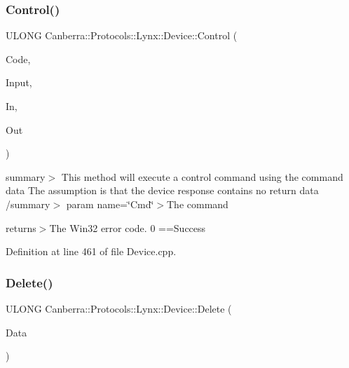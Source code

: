 \subsubsection{\texorpdfstring{Control()}{Control()}\hspace{0.1cm}{\footnotesize\ttfamily [4/4]}}
{\footnotesize\ttfamily U\+L\+O\+NG Canberra\+::\+Protocols\+::\+Lynx\+::\+Device\+::\+Control (\begin{DoxyParamCaption}\item[{L\+O\+NG}]{Code,  }\item[{U\+S\+H\+O\+RT}]{Input,  }\item[{\hyperlink{class_canberra_1_1_utility_1_1_core_1_1_byte_stream}{Canberra\+::\+Utility\+::\+Core\+::\+Byte\+Stream} \&}]{In,  }\item[{\hyperlink{class_canberra_1_1_utility_1_1_core_1_1_byte_stream}{Canberra\+::\+Utility\+::\+Core\+::\+Byte\+Stream} \&}]{Out }\end{DoxyParamCaption})}

summary$>$ This method will execute a control command using the command data The assumption is that the device response contains no return data /summary$>$ param name=\char`\"{}\+Cmd\char`\"{}$>$The command

returns$>$The Win32 error code. 0 ==Success

Definition at line 461 of file Device.\+cpp.

\mbox{\label{class_canberra_1_1_protocols_1_1_lynx_1_1_device_a16877dd4491fee82dcd4708cee09a43f_a16877dd4491fee82dcd4708cee09a43f}} 
\subsubsection{\texorpdfstring{Delete()}{Delete()}}
{\footnotesize\ttfamily U\+L\+O\+NG Canberra\+::\+Protocols\+::\+Lynx\+::\+Device\+::\+Delete (\begin{DoxyParamCaption}\item[{\hyperlink{class_canberra_1_1_data_types_1_1_spectroscopy_1_1_list_data_base}{Canberra\+::\+Data\+Types\+::\+Spectroscopy\+::\+List\+Data\+Base} $\ast$$\ast$}]{Data }\end{DoxyParamCaption})}

